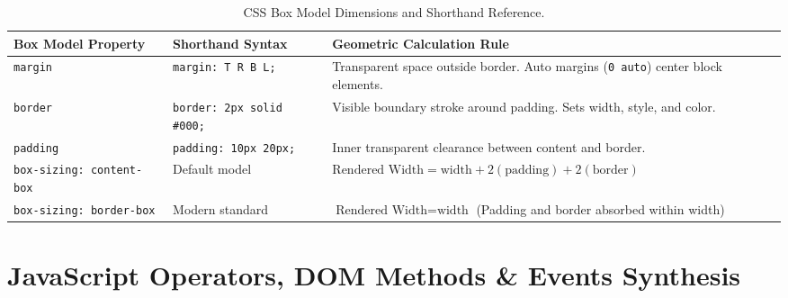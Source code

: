 \begin{table}[htbp]
\centering
\small
\renewcommand{\arraystretch}{1.2}
\begin{tabularx}{\linewidth}{ll>{\raggedright\arraybackslash}X}
\toprule
\textbf{Box Model Property} & \textbf{Shorthand Syntax} & \textbf{Geometric Calculation Rule} \\
\midrule
\texttt{margin} & \texttt{margin: T R B L;} & Transparent space outside border. Auto margins (\texttt{0 auto}) center block elements. \\
\texttt{border} & \texttt{border: 2px solid \#000;} & Visible boundary stroke around padding. Sets width, style, and color. \\
\texttt{padding} & \texttt{padding: 10px 20px;} & Inner transparent clearance between content and border. \\
\texttt{box-sizing: content-box} & Default model & $\text{Rendered Width} = \text{width} + 2(\text{padding}) + 2(\text{border})$ \\
\texttt{box-sizing: border-box} & Modern standard & $\text{Rendered Width} = \text{width}$ (Padding and border absorbed within width) \\
\bottomrule
\end{tabularx}
\caption{CSS Box Model Dimensions and Shorthand Reference.}
\label{tab:master-box-model}
\end{table}

\section{JavaScript Operators, DOM Methods \& Events Synthesis}

